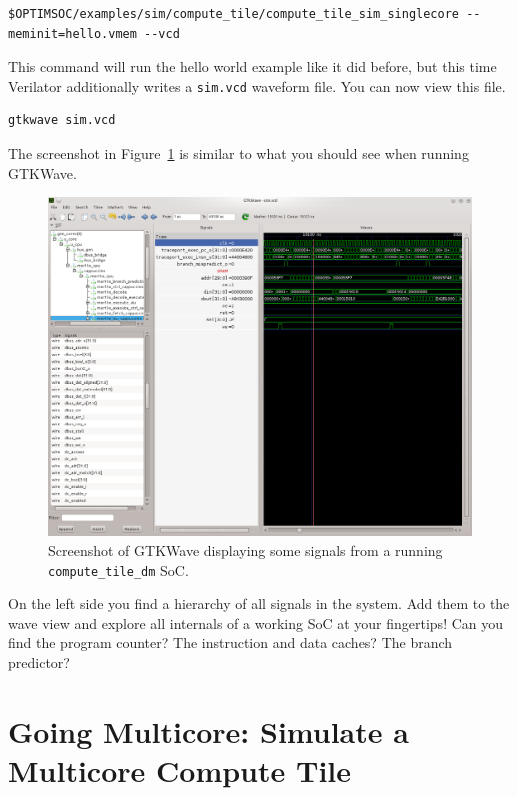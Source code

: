 \begin{lstlisting}
$OPTIMSOC/examples/sim/compute_tile/compute_tile_sim_singlecore --meminit=hello.vmem --vcd
\end{lstlisting}

This command will run the hello world example like it did before, but this time Verilator additionally writes a \verb|sim.vcd| waveform file.
You can now view this file.
\begin{lstlisting}
gtkwave sim.vcd
\end{lstlisting}
The screenshot in Figure~\ref{fig:tutorials:screenshot-gtkwave-compute_tile} is similar to what you should see when running GTKWave.

\begin{figure}
 \centering
 \includegraphics[width=\linewidth]{img/screenshot-gtkwave.png}
 \caption{Screenshot of GTKWave displaying some signals from a running \texttt{compute\_tile\_dm} SoC.}
 \label{fig:tutorials:screenshot-gtkwave-compute_tile}
\end{figure}

On the left side you find a hierarchy of all signals in the system.
Add them to the wave view and explore all internals of a working SoC at your fingertips!
Can you find the program counter? The instruction and data caches? The branch predictor?


\section{Going Multicore: Simulate a Multicore Compute Tile}

